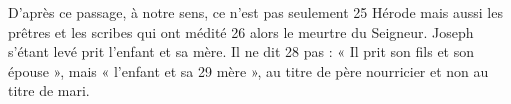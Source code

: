 D'après ce passage, à notre sens, ce n'est pas seulement	 
25	 	Hérode mais aussi les prêtres et les scribes qui ont médité	 
26	 	alors le meurtre du Seigneur.
Joseph s'étant levé prit l'enfant et sa mère. Il ne dit	 
28	 	pas : « Il prit son fils et son épouse », mais « l'enfant et sa	 
29	 	mère », au titre de père nourricier et non au titre de mari.